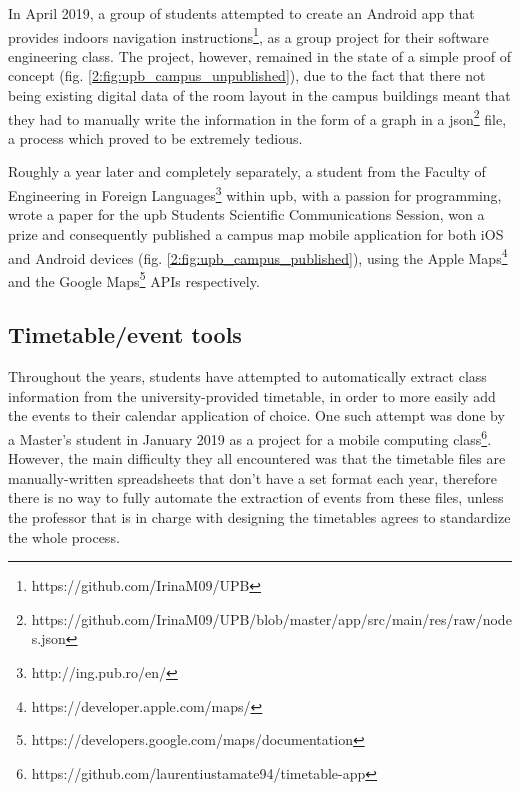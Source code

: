     In April 2019, a group of students attempted to create an Android app that provides indoors navigation instructions\footnote{https://github.com/IrinaM09/UPB}, as a group project for their software engineering class. The project, however, remained in the state of a simple proof of concept (fig. \ref{2:fig:upb_campus_unpublished}), due to the fact that there not being existing digital data of the room layout in the campus buildings meant that they had to manually write the information in the form of a graph in a \gls{json}\footnote{https://github.com/IrinaM09/UPB/blob/master/app/src/main/res/raw/nodes.json} file, a process which proved to be extremely tedious.
    
    Roughly a year later and completely separately, a student from the Faculty of Engineering in Foreign Languages\footnote{http://ing.pub.ro/en/} within \acrshort{upb}, with a passion for programming,  wrote a paper for the \acrshort{upb} Students Scientific Communications Session, won a prize and consequently published a campus map mobile application for both iOS and Android devices (fig. \ref{2:fig:upb_campus_published}), using the Apple Maps\footnote{https://developer.apple.com/maps/} and the Google Maps\footnote{https://developers.google.com/maps/documentation} APIs respectively.
    
    \subsection{Timetable/event tools} \label{2:existing_apps_timetable}
    Throughout the years, students have attempted to automatically extract class information from the university-provided timetable, in order to more easily add the events to their calendar application of choice. One such attempt was done by a Master's student in January 2019 as a project for a mobile computing class\footnote{https://github.com/laurentiustamate94/timetable-app}. However, the main difficulty they all encountered was that the timetable files are manually-written spreadsheets that don't have a set format each year, therefore there is no way to fully automate the extraction of events from these files, unless the professor that is in charge with designing the timetables agrees to standardize the whole process.
    
